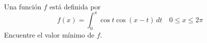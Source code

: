 \item Una función $f$ está definida por
    \[ f(x) = \int_0^\pi \cos t \cos(x - t) \, dt \quad 0 \le x \le 2\pi \]
    Encuentre el valor mínimo de $f$.
